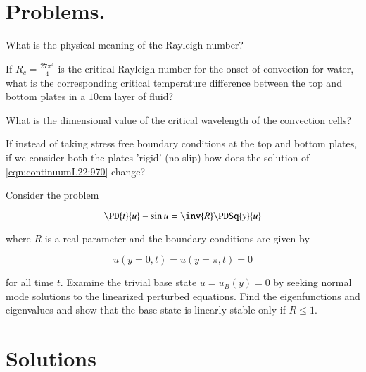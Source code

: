 \section{Problems.}

\begin{Exercise}
What is the physical meaning of the Rayleigh number?
\end{Exercise}
\begin{Exercise}
If $R_c = \frac{27 \pi^4}{4}$ is the critical Rayleigh number for the onset of convection for water, what is the corresponding critical temperature difference between the top and bottom plates in a $10 \text{cm}$ layer of fluid?
\end{Exercise}
\begin{Exercise}
What is the dimensional value of the critical wavelength of the convection cells?
\end{Exercise}
\begin{Exercise}
If instead of taking stress free boundary conditions at the top and bottom plates, if we consider both the plates 'rigid' (no-slip) how does the solution of \ref{eqn:continuumL22:970} change?
\end{Exercise}
\begin{Exercise}
Consider the problem

\begin{equation}\label{eqn:problemSet4:10}
\PD{t}{u} - \sin u = \inv{R} \PDSq{y}{u}
\end{equation}

where $R$ is a real parameter and the boundary conditions are given by

\begin{equation}\label{eqn:problemSet4:20}
u(y = 0, t) = u(y = \pi, t) = 0
\end{equation}

for all time $t$. Examine the trivial base state $u = u_B(y) = 0$ by seeking normal mode solutions to the linearized perturbed equations. Find the eigenfunctions and eigenvalues and show that the base state is linearly stable only if $R \le 1$.
\end{Exercise}

\section{Solutions}

\shipoutAnswer
